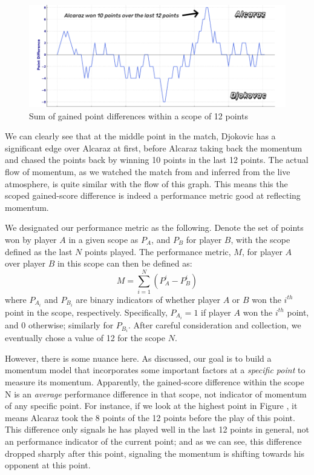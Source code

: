 \documentclass[12pt]{article}  %
\begin{document}
\begin{figure}[htbp]  %
	\centering  %
	\includegraphics[width=.6\textwidth]{difference.png} %
	\caption{Sum of gained point differences within a scope of 12 points} %
\end{figure}
\vspace{-0.2cm}

We can clearly see that at the middle point in the match, Djokovic has a significant edge over Alcaraz at first, before Alcaraz taking back the momentum and chased the points back by winning 10 points in the last 12 points. The actual flow of momentum, as we watched the match from \cite{7} and inferred from the live atmosphere, is quite similar with the flow of this graph. This means this the scoped gained-score difference is indeed a performance metric good at reflecting momentum.

We designated our performance metric as the following. Denote the set of points won by player \( A \) in a given scope as \( P_A \), and \( P_B \) for player \( B \), with the scope defined as the last \( N \) points played. The performance metric, \( M \), for player \( A \) over player \( B \) in this scope can then be defined as:
\[
M=\sum_{i=1}^{N}(P_{A}^i-P_{B}^i)
\]
where \( P_{A_i} \) and \( P_{B_i} \) are binary indicators of whether player \( A \) or \( B \) won the \( i^{th} \) point in the scope, respectively. Specifically, \( P_{A_i} = 1 \) if player \( A \) won the \( i^{th} \) point, and 0 otherwise; similarly for \( P_{B_i} \). After careful consideration and collection, we eventually chose a value of 12 for the scope $N$.

However, there is some nuance here. As discussed, our goal is to build a momentum model that incorporates some important factors at a \textit{specific point} to measure its momentum. Apparently, the gained-score difference within the scope N is an \textit{average} performance difference in that scope, not indicator of momentum of any specific point. For instance, if we look at the highest point in Figure , it means Alcaraz took the 8 points of the 12 points before the play of this point. This difference only signals he has played well in the last 12 points in general, not an performance indicator of the current point; and as we can see, this difference dropped sharply after this point, signaling the momentum is shifting towards his opponent at this point.
\end{document}
